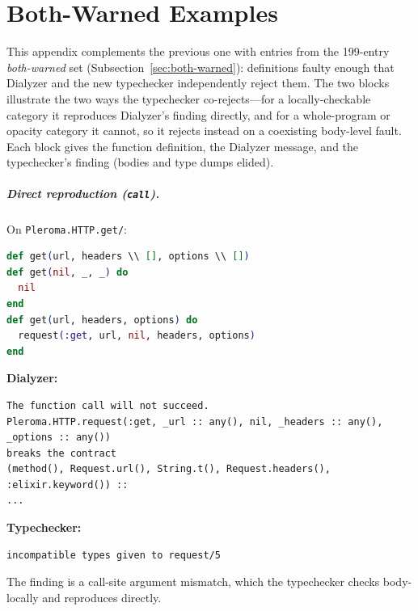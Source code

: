 \chapter{Both-Warned Examples}
\label{app:both-examples}
\sloppy

This appendix complements the previous one with entries from the 199-entry \emph{both-warned} set (Subsection~\ref{sec:both-warned}): definitions faulty enough that Dialyzer and the new typechecker independently reject them. The two blocks illustrate the two ways the typechecker co-rejects---for a locally-checkable category it reproduces Dialyzer's finding directly, and for a whole-program or opacity category it cannot, so it rejects instead on a coexisting body-level fault. Each block gives the function definition, the Dialyzer message, and the typechecker's finding (bodies and type dumps elided).

\paragraph{Direct reproduction (\texttt{call}).} On \texttt{Pleroma.\allowbreak HTTP.\allowbreak get/}:
\begin{lstlisting}[language=Elixir,breaklines=true]
def get(url, headers \\ [], options \\ [])
def get(nil, _, _) do
  nil
end
def get(url, headers, options) do
  request(:get, url, nil, headers, options)
end
\end{lstlisting}
\noindent\textbf{Dialyzer:}
\begin{lstlisting}[breaklines=true]
The function call will not succeed.
Pleroma.HTTP.request(:get, _url :: any(), nil, _headers :: any(), _options :: any())
breaks the contract
(method(), Request.url(), String.t(), Request.headers(), :elixir.keyword()) ::
...
\end{lstlisting}
\noindent\textbf{Typechecker:}
\begin{lstlisting}[breaklines=true]
incompatible types given to request/5
\end{lstlisting}
\noindent The finding is a call-site argument mismatch, which the typechecker checks body-locally and reproduces directly.


